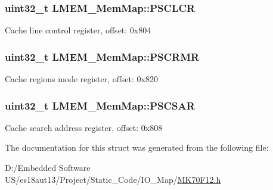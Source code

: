 \subsubsection[{P\+S\+C\+L\+C\+R}]{\setlength{\rightskip}{0pt plus 5cm}uint32\+\_\+t L\+M\+E\+M\+\_\+\+Mem\+Map\+::\+P\+S\+C\+L\+C\+R}\label{struct_l_m_e_m___mem_map_a9002773a5254b5d1ebb9a46218ef21c4}
Cache line control register, offset\+: 0x804 \hypertarget{struct_l_m_e_m___mem_map_a06dad54d3dcb178443d2c9b0d5ae2496}{}
\subsubsection[{P\+S\+C\+R\+M\+R}]{\setlength{\rightskip}{0pt plus 5cm}uint32\+\_\+t L\+M\+E\+M\+\_\+\+Mem\+Map\+::\+P\+S\+C\+R\+M\+R}\label{struct_l_m_e_m___mem_map_a06dad54d3dcb178443d2c9b0d5ae2496}
Cache regions mode register, offset\+: 0x820 \hypertarget{struct_l_m_e_m___mem_map_ad54ebfe0c32863df5645bc4416dfe3dc}{}
\subsubsection[{P\+S\+C\+S\+A\+R}]{\setlength{\rightskip}{0pt plus 5cm}uint32\+\_\+t L\+M\+E\+M\+\_\+\+Mem\+Map\+::\+P\+S\+C\+S\+A\+R}\label{struct_l_m_e_m___mem_map_ad54ebfe0c32863df5645bc4416dfe3dc}
Cache search address register, offset\+: 0x808 

The documentation for this struct was generated from the following file\+:\begin{DoxyCompactItemize}
\item 
D\+:/\+Embedded Software U\+S/es18aut13/\+Project/\+Static\+\_\+\+Code/\+I\+O\+\_\+\+Map/\hyperlink{_m_k70_f12_8h}{M\+K70\+F12.\+h}\end{DoxyCompactItemize}
